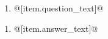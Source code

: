 \documentclass[uplatex,a4j,11pt]{jsarticle}
\begin{document}
\begin{enumerate}
  \item \begin{minipage}[t][4.72cm][t]{\linewidth}
    @[item.question\_text]@
    \vfill
    \hfill
    \framebox[0.5\linewidth]{\rule{0ex}{7mm}}
    \end{minipage}
\end{enumerate}
\newpage
{}
\cfoot{}
\begin{multicols}{3}
\begin{enumerate}
  \item @[item.answer\_text]@
\end{enumerate}
\newpage
\end{multicols}
\end{document}
